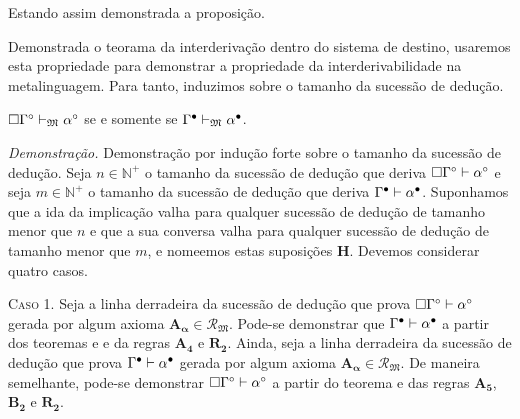 \begin{tcolorbox}[enhanced jigsaw, breakable, sharp corners, colframe=black, colback=white, boxrule=0.5pt, left=1.5mm, right=1.5mm, top=1.5mm, bottom=1.5mm]
        \vspace{.5\baselineskip}
        Estando assim demonstrada a proposição.
\end{tcolorbox}

\vspace{.5\baselineskip}
Demonstrada o teorama da interderivação dentro do sistema de destino, usaremos esta propriedade para demonstrar a propriedade da interderivabilidade na metalinguagem.
Para tanto, induzimos sobre o tamanho da sucessão de dedução.

\vspace{.5\baselineskip}
\begin{tcolorbox}[enhanced jigsaw, breakable, sharp corners, colframe=black, colback=white, boxrule=0.5pt, left=1.5mm, right=1.5mm, top=1.5mm, bottom=1.5mm]
    \begin{theorem}[Interderivação]\label{interderivability}
        $\Box\Gamma^\circ\mathrel{\vdash}_\mathfrak{M}\alpha^\circ$ se e somente se $\Gamma^\bullet\mathrel{\vdash}_\mathfrak{M}\alpha^\bullet$.
    \end{theorem}

    \emph{Demonstração.}
    Demonstração por indução forte sobre o tamanho da sucessão de dedução.
    Seja $n\in\mathbb{N}^+$ o tamanho da sucessão de dedução que deriva $\Box\Gamma^\circ\mathrel{\vdash}\alpha^\circ$ e seja $m\in\mathbb{N}^+$ o tamanho da sucessão de dedução que deriva $\Gamma^\bullet\mathrel{\vdash}\alpha^\bullet$. Suponhamos que a ida da implicação valha para qualquer sucessão de dedução de tamanho menor que $n$ e que a sua conversa valha para qualquer sucessão de dedução de tamanho menor que $m$, e nomeemos estas suposições $\mathbf{H}$.
    Devemos considerar quatro casos.

    \vspace{.5\baselineskip}
    \textsc{Caso 1.}
    Seja a linha derradeira da sucessão de dedução que prova $\Box\Gamma^\circ\mathrel{\vdash}\alpha^\circ$ gerada por algum axioma ${\mathbf{A_\alpha}\in\mathcal{R}_\mathfrak{M}}$.
    Pode-se demonstrar que $\Gamma^\bullet\mathrel{\vdash}\alpha^\bullet$ a partir dos teoremas  e  e da regras $\hyperref[modal.axiom.4]{\mathbf{A_4}}$ e $\hyperref[modal.rule.2]{\mathbf{R_2}}$.
    Ainda, seja a linha derradeira da sucessão de dedução que prova $\Gamma^\bullet\mathrel{\vdash}\alpha^\bullet$ gerada por algum axioma ${\mathbf{A_\alpha}\in\mathcal{R}_\mathfrak{M}}$.
    De maneira semelhante, pode-se demonstrar $\Box\Gamma^\circ\mathrel{\vdash}\alpha^\circ$ a partir do teorema  e das regras $\hyperref[modal.axiom.4]{\mathbf{A_5}}$, $\hyperref[modal.axiom.4]{\mathbf{B_2}}$ e $\hyperref[modal.rule.2]{\mathbf{R_2}}$.


\end{tcolorbox}
